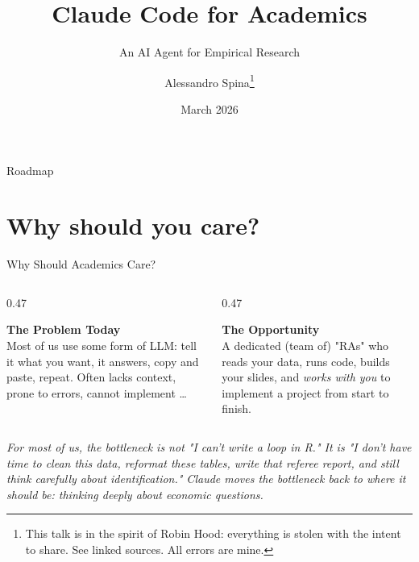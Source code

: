 \documentclass[aspectratio=169, 11pt]{beamer}
\title[Claude Code]{Claude Code for Academics}
\subtitle{An AI Agent for Empirical Research}
\author{Alessandro Spina\thanks{This talk is in the spirit of Robin Hood: everything is stolen with the intent to share. See linked sources. All errors are mine.}}
\institute{UTS Finance Department Brownbag}
\date{March 2026}
\begin{document}
\begin{frame}[plain]
\titlepage
\end{frame}

\begin{frame}{Roadmap}
\tableofcontents
\end{frame}

\section{Why should you care?}



\begin{frame}{Why Should Academics Care?}
\vspace{0.05cm}
\begin{columns}[T]
\begin{column}{0.47\textwidth}
  \begin{tcolorbox}[
    enhanced,
    colback=red!5,
    colframe=red!30,
    boxrule=0.5pt,
    sharp corners,
    left=8pt, right=8pt, top=2pt, bottom=6pt,
  ]
    {\large\bfseries\color{navy}The Problem Today}\\[8pt]
    Most of us use some form of LLM: tell it what you want, it answers, copy and paste, repeat. Often lacks context, prone to errors, cannot implement \ldots
  \end{tcolorbox}
\end{column}
\begin{column}{0.47\textwidth}
  \begin{tcolorbox}[
    enhanced,
    colback=green!5,
    colframe=green!30!black,
    boxrule=0.5pt,
    sharp corners,
    left=8pt, right=8pt, top=6pt, bottom=1pt,
  ]
    {\large\bfseries\color{navy}The Opportunity}\\[6pt]
    A dedicated (team of) "RAs" who reads your data, runs code, builds your slides, and \emph{works with you} to implement a project from start to finish.
  \end{tcolorbox}
\end{column}
\end{columns}

\vspace{0.05cm}
\begin{quotebox}
  \textit{For most of us, the bottleneck is not "I can't write a loop in R." It is "I don't have time to clean this data, reformat these tables, write that referee report, and still think carefully about identification." Claude moves the bottleneck back to where it should be: thinking deeply about economic questions.}
\end{quotebox}
\end{frame}
\end{document}
